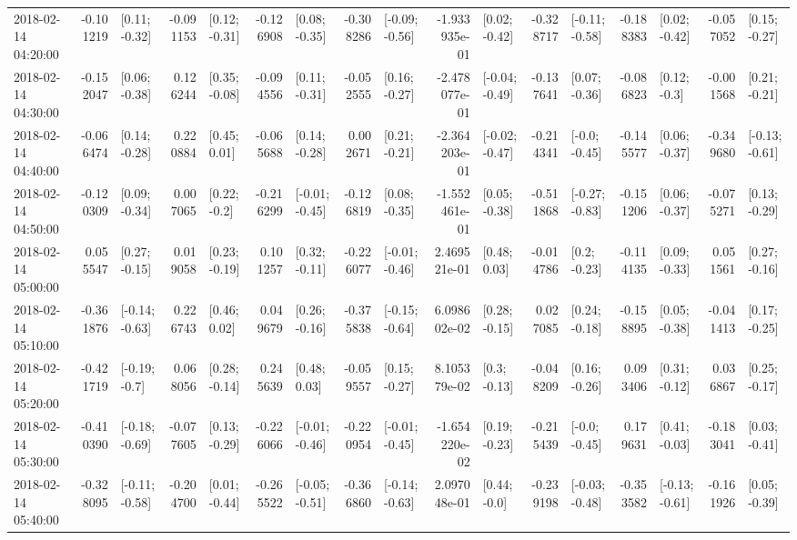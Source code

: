 \begin{tabular}{lrlrlrlrlrlrlrlrl}
2018-02-14 04:20:00 & -0.101219 &   [0.11; -0.32] & -0.091153 &   [0.12; -0.31] & -0.126908 &   [0.08; -0.35] & -0.308286 &  [-0.09; -0.56] & -1.933935e-01 &   [0.02; -0.42] & -0.328717 &  [-0.11; -0.58] & -0.188383 &   [0.02; -0.42] & -0.057052 &   [0.15; -0.27] \\
2018-02-14 04:30:00 & -0.152047 &   [0.06; -0.38] &  0.126244 &   [0.35; -0.08] & -0.094556 &   [0.11; -0.31] & -0.052555 &   [0.16; -0.27] & -2.478077e-01 &  [-0.04; -0.49] & -0.137641 &   [0.07; -0.36] & -0.086823 &    [0.12; -0.3] & -0.001568 &   [0.21; -0.21] \\
2018-02-14 04:40:00 & -0.066474 &   [0.14; -0.28] &  0.220884 &    [0.45; 0.01] & -0.065688 &   [0.14; -0.28] &  0.002671 &   [0.21; -0.21] & -2.364203e-01 &  [-0.02; -0.47] & -0.214341 &   [-0.0; -0.45] & -0.145577 &   [0.06; -0.37] & -0.349680 &  [-0.13; -0.61] \\
2018-02-14 04:50:00 & -0.120309 &   [0.09; -0.34] &  0.007065 &    [0.22; -0.2] & -0.216299 &  [-0.01; -0.45] & -0.126819 &   [0.08; -0.35] & -1.552461e-01 &   [0.05; -0.38] & -0.511868 &  [-0.27; -0.83] & -0.151206 &   [0.06; -0.37] & -0.075271 &   [0.13; -0.29] \\
2018-02-14 05:00:00 &  0.055547 &   [0.27; -0.15] &  0.019058 &   [0.23; -0.19] &  0.101257 &   [0.32; -0.11] & -0.226077 &  [-0.01; -0.46] &  2.469521e-01 &    [0.48; 0.03] & -0.014786 &    [0.2; -0.23] & -0.114135 &   [0.09; -0.33] &  0.051561 &   [0.27; -0.16] \\
2018-02-14 05:10:00 & -0.361876 &  [-0.14; -0.63] &  0.226743 &    [0.46; 0.02] &  0.049679 &   [0.26; -0.16] & -0.375838 &  [-0.15; -0.64] &  6.098602e-02 &   [0.28; -0.15] &  0.027085 &   [0.24; -0.18] & -0.158895 &   [0.05; -0.38] & -0.041413 &   [0.17; -0.25] \\
2018-02-14 05:20:00 & -0.421719 &   [-0.19; -0.7] &  0.068056 &   [0.28; -0.14] &  0.245639 &    [0.48; 0.03] & -0.059557 &   [0.15; -0.27] &  8.105379e-02 &    [0.3; -0.13] & -0.048209 &   [0.16; -0.26] &  0.093406 &   [0.31; -0.12] &  0.036867 &   [0.25; -0.17] \\
2018-02-14 05:30:00 & -0.410390 &  [-0.18; -0.69] & -0.077605 &   [0.13; -0.29] & -0.226066 &  [-0.01; -0.46] & -0.220954 &  [-0.01; -0.45] & -1.654220e-02 &   [0.19; -0.23] & -0.215439 &   [-0.0; -0.45] &  0.179631 &   [0.41; -0.03] & -0.183041 &   [0.03; -0.41] \\
2018-02-14 05:40:00 & -0.328095 &  [-0.11; -0.58] & -0.204700 &   [0.01; -0.44] & -0.265522 &  [-0.05; -0.51] & -0.366860 &  [-0.14; -0.63] &  2.097048e-01 &    [0.44; -0.0] & -0.239198 &  [-0.03; -0.48] & -0.353582 &  [-0.13; -0.61] & -0.161926 &   [0.05; -0.39] \\

\end{tabular}
